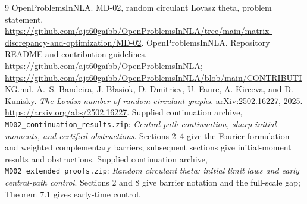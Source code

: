 \documentclass[11pt]{article}
\theoremstyle{remark}\newtheorem{remark}[theorem]{Remark}
\begin{document}
\begin{thebibliography}{9}
OpenProblemsInNLA. MD-02, random circulant Lovasz theta, problem statement.
\url{https://github.com/ajt60gaibb/OpenProblemsInNLA/tree/main/matrix-discrepancy-and-optimization/MD-02}.
OpenProblemsInNLA. Repository README and contribution guidelines.
\url{https://github.com/ajt60gaibb/OpenProblemsInNLA};
\url{https://github.com/ajt60gaibb/OpenProblemsInNLA/blob/main/CONTRIBUTING.md}.
A.~S. Bandeira, J. B{\l}asiok, D. Dmitriev, U. Faure, A. Kireeva, and
D. Kunisky. \emph{The Lov\'asz number of random circulant graphs}.
arXiv:2502.16227, 2025. \url{https://arxiv.org/abs/2502.16227}.
Supplied continuation archive, \texttt{MD02\_continuation\_results.zip}:
\emph{Central-path continuation, sharp initial moments, and certified
obstructions}. Sections 2--4 give the Fourier formulation and weighted
complementary barriers; subsequent sections give initial-moment results and
obstructions.
Supplied continuation archive, \texttt{MD02\_extended\_proofs.zip}:
\emph{Random circulant theta: initial limit laws and early central-path
control}. Sections 2 and 8 give barrier notation and the full-scale gap;
Theorem 7.1 gives early-time control.
\end{thebibliography}
\end{document}
